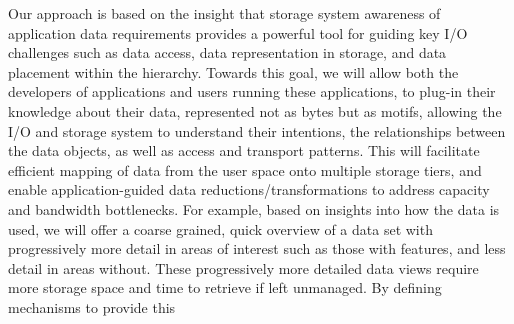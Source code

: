 \documentclass[11pt,letterpaper]{article}
\begin{document}
Our  approach is based on the insight that storage system awareness
of application data requirements provides a powerful tool for guiding key
I/O challenges such as data access,  data representation in
storage, and data
placement within the hierarchy.
Towards this goal, we will allow both the developers of applications
and users running these applications, 
 to plug-in their knowledge 
about their data, represented not as bytes but as motifs, allowing the I/O and 
storage system to understand their
intentions, the relationships between the data objects, as well as access
and transport patterns. This will facilitate efficient mapping of data from
the user space onto multiple storage tiers, and enable application-guided
data reductions/transformations to address capacity and bandwidth
bottlenecks. 
%
%
 For example, based on insights into how the data is used,
we will offer a coarse grained, quick overview of a data set with progressively more detail in 
areas of interest such as those with features, and less detail in areas
without. These progressively more detailed data views require more storage
space and time to retrieve if left unmanaged. By defining mechanisms to provide this 
\end{document}

